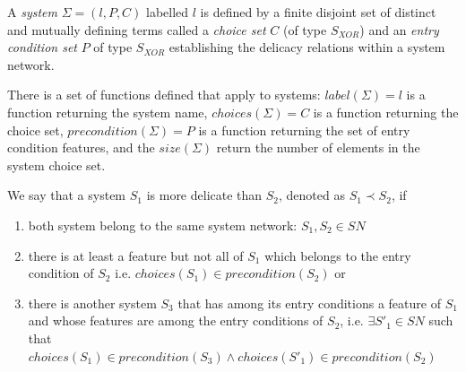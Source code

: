     \begin{definition}[System]\label{def:formal-system}
    A \textit{system} $\Sigma=(l,P,C)$ labelled $l$ is defined by a finite disjoint set of distinct and mutually defining terms called a \textit{choice set} $C$ (of type $S_{XOR}$) and an \textit{entry condition set} $P$ of type $S_{XOR}$ establishing the delicacy relations within a system network.
    \end{definition}

    There is a set of functions defined that apply to systems: $label(\Sigma)=l$ is a function returning the system name, $choices(\Sigma)=C$ is a function returning the choice set, $precondition(\Sigma)=P$ is a function returning the set of entry condition features, and the $size(\Sigma)$ return the number of elements in the system choice set.  

    \begin{definition} \label{def:delicacy-hierarchy}
    	We say that a system $S_{1}$ is more delicate than $S_{2}$, denoted as $S_{1} \prec S_{2}$, if 
    	\begin{enumerate}
    		\item both system belong to the same system network: $S_{1}, S_{2} \in SN$ 
    		\item there is at least a feature but not all of $S_{1}$ which belongs to the entry condition of $S_{2}$ i.e. $choices(S_{1}) \in precondition(S_{2})$ or
            \item there is another system $S_{3}$ that has among its entry conditions a feature of $S_1$ and whose features are among the entry conditions of $S_{2}$, i.e. $ \exists S'_{1} \in SN$ such that $ choices(S_{1}) \in precondition(S_{3}) \land choices(S'_{1}) \in precondition(S_{2})$
    	\end{enumerate} 
    \end{definition}

